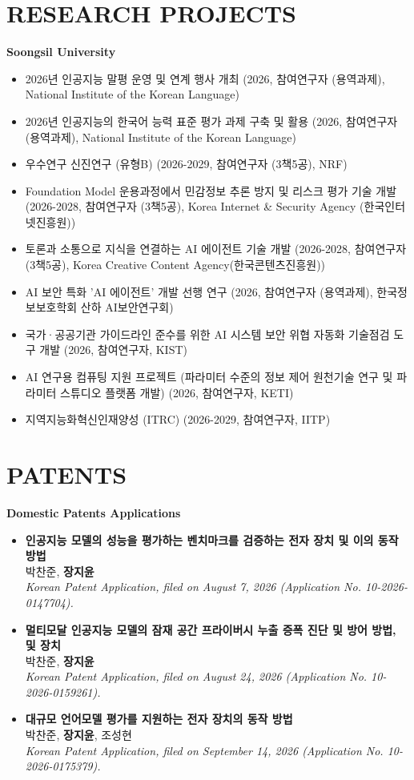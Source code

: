 \documentclass[10pt,a4paper]{article}
\newcommand{\seclabel}[1]{\section*{\uppercase{#1}}}
\begin{document}
\newpage

\seclabel{Research Projects}
\textbf{Soongsil University}
\begin{itemize}[left=0pt]
    \item \small 2026년 인공지능 말평 운영 및 연계 행사 개최 (2026, 참여연구자 (용역과제), National Institute of the Korean Language)
    \item \small 2026년 인공지능의 한국어 능력 표준 평가 과제 구축 및 활용 (2026, 참여연구자 (용역과제), National Institute of the Korean Language)
    \item \small 우수연구 신진연구 (유형B) (2026-2029, 참여연구자 (3책5공), NRF)
    \item \small Foundation Model 운용과정에서 민감정보 추론 방지 및 리스크 평가 기술 개발 (2026-2028, 참여연구자 (3책5공), Korea Internet \& Security Agency (한국인터넷진흥원))
    \item \small 토론과 소통으로 지식을 연결하는 AI 에이전트 기술 개발 (2026-2028, 참여연구자 (3책5공), Korea Creative Content Agency(한국콘텐츠진흥원))
    \item \small AI 보안 특화 'AI 에이전트' 개발 선행 연구 (2026,  참여연구자 (용역과제), 한국정보보호학회 산하 AI보안연구회)
    \item \small 국가·공공기관 가이드라인 준수를 위한 AI 시스템 보안 위협 자동화 기술점검 도구 개발 (2026, 참여연구자, KIST)
    \item \small AI 연구용 컴퓨팅 지원 프로젝트 (파라미터 수준의 정보 제어 원천기술 연구 및 파라미터 스튜디오 플랫폼 개발) (2026,  참여연구자, KETI)
    \item \small 지역지능화혁신인재양성 (ITRC) (2026-2029,  참여연구자, IITP)
\end{itemize}

\seclabel{Patents}
\textbf{Domestic Patents Applications}
\begin{itemize}
    \item \small{\textbf{인공지능 모델의 성능을 평가하는 벤치마크를 검증하는 전자 장치 및 이의 동작 방법} \\
    박찬준, \textbf{장지윤} \\
    \textit{Korean Patent Application, filed on August 7, 2026 (Application No. 10-2026-0147704).}}
    \item \small{\textbf{멀티모달 인공지능 모델의 잠재 공간 프라이버시 누출 증폭 진단 및 방어 방법, 및 장치} \\
    박찬준, \textbf{장지윤} \\
    \textit{Korean Patent Application, filed on August 24, 2026 (Application No. 10-2026-0159261).}}
    \item \small{\textbf{대규모 언어모델 평가를 지원하는 전자 장치의 동작 방법} \\
    박찬준, \textbf{장지윤}, 조성현 \\
    \textit{Korean Patent Application, filed on September 14, 2026 (Application No. 10-2026-0175379).}}
\end{itemize}
\end{document}
